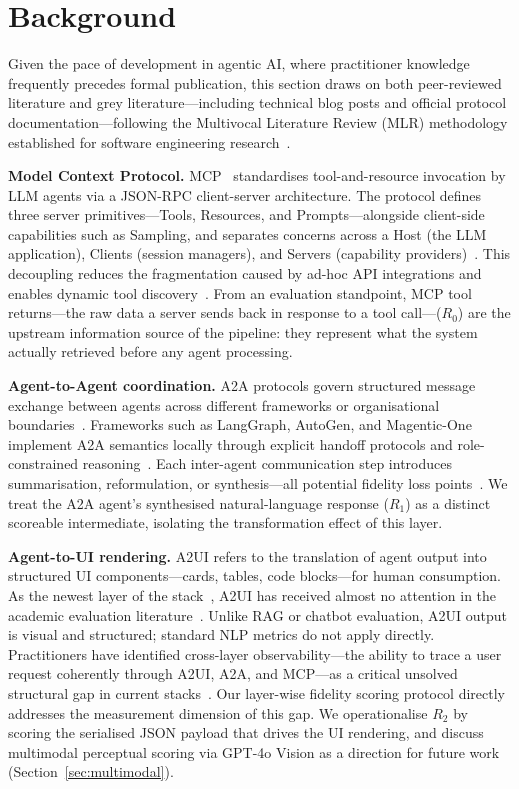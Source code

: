 \documentclass[10pt,journal,compsoc]{IEEEtran}
\begin{document}
\section{Background}
\label{sec:background}

Given the pace of development in agentic AI, where practitioner knowledge
frequently precedes formal publication, this section draws on both peer-reviewed
literature and grey literature---including technical blog posts and official
protocol documentation---following the Multivocal Literature Review (MLR)
methodology established for software engineering research~\cite{garousi2019mlr}.

\noindent\textbf{Model Context Protocol.}
MCP~\cite{anthropic2024mcp} standardises
tool-and-resource invocation by LLM agents via a JSON-RPC client-server
architecture. The protocol defines three server primitives---Tools, Resources,
and Prompts---alongside client-side capabilities such as Sampling, and
separates concerns across a Host (the LLM application), Clients (session
managers), and Servers (capability
providers)~\cite{ehtesham2025survey,ray2025mcpsurvey,singh2025mcpstandardizing}.
This decoupling reduces the fragmentation caused by ad-hoc API integrations and
enables dynamic tool discovery~\cite{ehtesham2025survey}. From an evaluation
standpoint, MCP tool returns---the raw data a server sends back in response to a tool
call---($R_0$) are the upstream information source of
the pipeline: they represent what the system actually retrieved before any agent
processing.

\noindent\textbf{Agent-to-Agent coordination.}
A2A protocols govern structured message
exchange between agents across different frameworks or organisational
boundaries~\cite{ehtesham2025survey,google2025a2a}. Frameworks such as LangGraph,
AutoGen, and Magentic-One implement A2A semantics locally through explicit handoff
protocols and role-constrained
reasoning~\cite{tokal2025agentx,derouiche2025agentic}. Each inter-agent
communication step introduces summarisation, reformulation, or
synthesis---all potential fidelity loss points~\cite{yan2025beyondselftalk}. We
treat the A2A agent's synthesised natural-language response ($R_1$) as a distinct
scoreable intermediate, isolating the transformation effect of this layer.

\noindent\textbf{Agent-to-UI rendering.}
A2UI refers to the translation of agent output into structured UI
components---cards, tables, code blocks---for human consumption. As the newest
layer of the stack~\cite{google2025a2ui}, A2UI has
received almost no attention in the academic evaluation
literature~\cite{mitra2026stack}. Unlike RAG or chatbot evaluation, A2UI output is
visual and structured; standard NLP metrics do not apply directly. Practitioners
have identified cross-layer observability---the ability to trace a user request
coherently through A2UI, A2A, and MCP---as a critical unsolved structural gap in
current stacks~\cite{mitra2026stack}. Our layer-wise fidelity scoring protocol
directly addresses the measurement dimension of this gap. We operationalise $R_2$
by scoring the serialised JSON payload that drives the UI rendering, and discuss
multimodal perceptual scoring via GPT-4o Vision as a direction for future work
(Section~\ref{sec:multimodal}).
\end{document}
